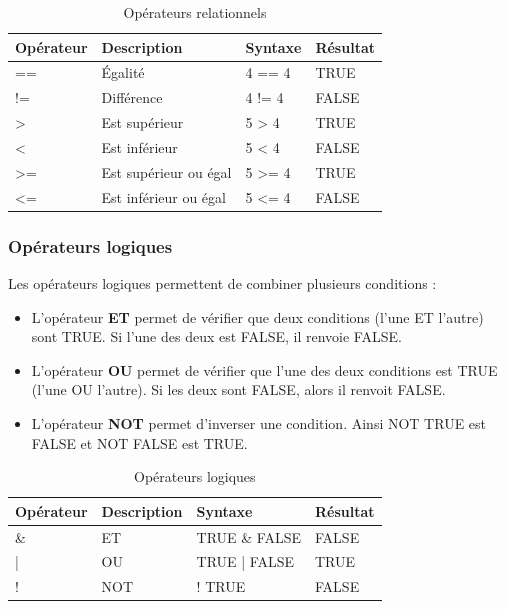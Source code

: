 \documentclass[
  11pt,
  french,
]{book}
\begin{document}
\begin{table}

\caption{\label{tab:tableOperateurRela}Opérateurs relationnels}
\centering
\fontsize{8}{10}\selectfont
\begin{tabular}[t]{llll}
\toprule
Opérateur & Description & Syntaxe & Résultat\\
\midrule
== & Égalité & 4 == 4 & TRUE\\
!= & Différence & 4 != 4 & FALSE\\
> & Est supérieur & 5 > 4 & TRUE\\
< & Est inférieur & 5 < 4 & FALSE\\
>= & Est supérieur ou égal & 5 >= 4 & TRUE\\
\addlinespace
<= & Est inférieur ou égal & 5 <= 4 & FALSE\\
\bottomrule
\end{tabular}
\end{table}

\hypertarget{sect01353}{%
\subsubsection{Opérateurs logiques}\label{sect01353}}

Les opérateurs logiques permettent de combiner plusieurs conditions :

\begin{itemize}
\item
  L'opérateur \textbf{ET} permet de vérifier que deux conditions (l'une ET l'autre) sont TRUE. Si l'une des deux est FALSE, il renvoie FALSE.
\item
  L'opérateur \textbf{OU} permet de vérifier que l'une des deux conditions est TRUE (l'une OU l'autre). Si les deux sont FALSE, alors il renvoit FALSE.
\item
  L'opérateur \textbf{NOT} permet d'inverser une condition. Ainsi NOT TRUE est FALSE et NOT FALSE est TRUE.
\end{itemize}

\begin{table}

\caption{\label{tab:tableOperateurLogi}Opérateurs logiques}
\centering
\fontsize{8}{10}\selectfont
\begin{tabular}[t]{llll}
\toprule
Opérateur & Description & Syntaxe & Résultat\\
\midrule
\& & ET & TRUE \& FALSE & FALSE\\
| & OU & TRUE | FALSE & TRUE\\
! & NOT & ! TRUE & FALSE\\
\bottomrule
\end{tabular}
\end{table}
\end{document}
